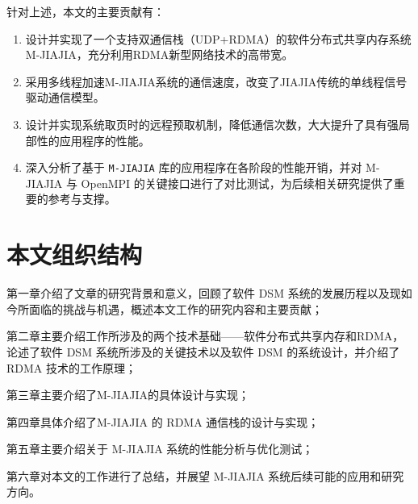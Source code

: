 {  针对上述，本文的主要贡献有：
  \begin{enumerate}[leftmargin=1em, align=left]
    \item 设计并实现了一个支持双通信栈（UDP+RDMA）的软件分布式共享内存系统 M-JIAJIA，充分利用RDMA新型网络技术的高带宽。
    \item 采用多线程加速M-JIAJIA系统的通信速度，改变了JIAJIA传统的单线程信号驱动通信模型。
    \item 设计并实现系统取页时的远程预取机制，降低通信次数，大大提升了具有强局部性的应用程序的性能。
    \item 深入分析了基于 \texttt{M-JIAJIA} 库的应用程序在各阶段的性能开销，并对 M-JIAJIA 与 OpenMPI 的关键接口进行了对比测试，为后续相关研究提供了重要的参考与支撑。
  \end{enumerate}
  \section{本文组织结构}
  第一章介绍了文章的研究背景和意义，回顾了软件 DSM 系统的发展历程以及现如今所面临的挑战与机遇，概述本文工作的研究内容和主要贡献；

  第二章主要介绍工作所涉及的两个技术基础——软件分布式共享内存和RDMA，论述了软件 DSM 系统所涉及的关键技术以及软件 DSM 的系统设计，并介绍了 RDMA 技术的工作原理；

  第三章主要介绍了M-JIAJIA的具体设计与实现；

  第四章具体介绍了M-JIAJIA 的 RDMA 通信栈的设计与实现；

  第五章主要介绍关于 M-JIAJIA 系统的性能分析与优化测试；

  第六章对本文的工作进行了总结，并展望 M-JIAJIA 系统后续可能的应用和研究方向。
}
